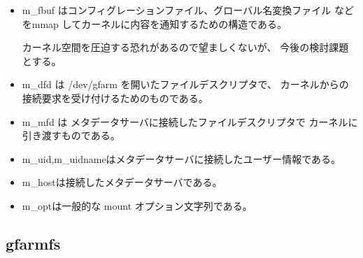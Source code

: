 	\begin{itemize}
	\item	m_fbuf はコンフィグレーションファイル、グローバル名変換ファイル
		などをmmap してカーネルに内容を通知するための構造である。

		カーネル空間を圧迫する恐れがあるので望ましくないが、
		今後の検討課題とする。
	\item	m_dfd は /dev/gfarm を開いたファイルデスクリプタで、
		カーネルからの接続要求を受け付けるためのものである。
	\item	m_mfd は メタデータサーバに接続したファイルデスクリプタで
		カーネルに引き渡すものである。
	\item	m_uid,m_uidnameはメタデータサーバに接続したユーザー情報である。
	\item	m_hostは接続したメタデータサーバである。
	\item	m_optは一般的な mount オプション文字列である。
	\end{itemize}
\subsection{gfarmfs}


